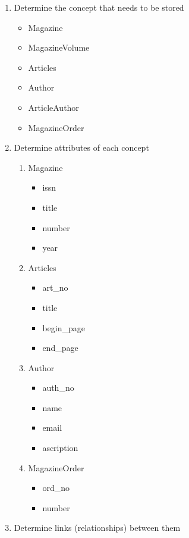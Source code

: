 \documentclass[]{article}
\begin{document}
\begin{enumerate}

\item Determine the concept that needs to be stored

\begin{itemize}
\item Magazine
\item MagazineVolume
\item Articles
\item Author
\item ArticleAuthor
\item MagazineOrder
\end{itemize}

\item Determine attributes of each concept

\begin{enumerate}
\item Magazine
\begin{itemize}
\item issn
\item title
\item number
\item year
\end{itemize}

\item Articles
\begin{itemize}
\item art\_no
\item title
\item begin\_page
\item end\_page
\end{itemize}

\item Author
\begin{itemize}
\item auth\_no
\item name
\item email
\item ascription
\end{itemize}

\item MagazineOrder
\begin{itemize}
\item ord\_no
\item number
\end{itemize}
\end{enumerate}

\item Determine links (relationships) between them


\end{enumerate}
\end{document}
